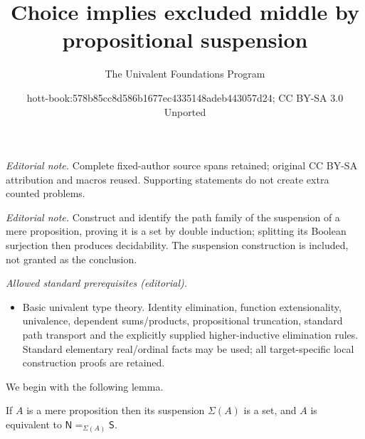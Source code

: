 \documentclass[10pt,a4paper]{article}
\title{Choice implies excluded middle by propositional suspension}
\author{The Univalent Foundations Program}
\date{hott-book:578b85cc8d586b1677ec4335148adeb443057d24; CC BY-SA 3.0 Unported}
\newcounter{chapter}
\newcommand{\id}[3][]{\ensuremath{#2 =_{#1} #3}\xspace}
\newcommand{\susp}{\Sigma}
\newcommand{\north}{\mathsf{N}}
\newcommand{\south}{\mathsf{S}}
\theoremstyle{definition}
\theoremstyle{remark}
\numberwithin{equation}{section}
\begin{document}
\maketitle
\setcounter{chapter}{10}
\setcounter{section}{0}
\setcounter{thm}{0}
\noindent\textit{Editorial note.} Complete fixed-author source spans retained; original CC BY-SA attribution and macros reused. Supporting statements do not create extra counted problems.\par\medskip
\noindent\textit{Editorial note.} Construct and identify the path family of the suspension of a mere proposition, proving it is a set by double induction; splitting its Boolean surjection then produces decidability. The suspension construction is included, not granted as the conclusion.\par\medskip
\noindent\textit{Allowed standard prerequisites (editorial).}\begin{itemize}
\item Basic univalent type theory. Identity elimination, function extensionality, univalence, dependent sums/products, propositional truncation, standard path transport and the explicitly supplied higher-inductive elimination rules. Standard elementary real/ordinal facts may be used; all target-specific local construction proofs are retained.
\end{itemize}\medskip
We begin with the following lemma.

\begin{lem}\label{prop:trunc_of_prop_is_set}
If $A$ is a mere proposition then its suspension $\susp(A)$ is a set,
and $A$ is equivalent to $\id[\susp(A)]{\north}{\south}$.
\end{lem}
\end{document}
